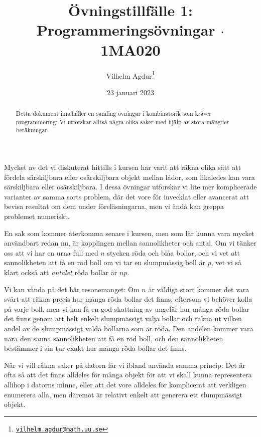 \documentclass[nobib]{tufte-handout}
\title{Övningstillfälle 1: Programmeringsövningar $\cdot$ 1MA020}
\author[Vilhelm Agdur]{Vilhelm Agdur\thanks{\href{mailto:vilhelm.agdur@math.uu.se}{\nolinkurl{vilhelm.agdur@math.uu.se}}}}
\date{23 januari 2023}
\begin{document}
\maketitle%

\begin{abstract}
\noindent
Detta dokument innehåller en samling övningar i kombinatorik som kräver programmering: Vi utforskar alltså några olika saker med hjälp av stora mängder beräkningar.
\end{abstract}

Mycket av det vi diskuterat hittills i kursen har varit att räkna olika sätt att fördela särskiljbara eller osärskiljbara objekt mellan lådor, som likaledes kan vara särskiljbara eller osärskiljbara. I dessa övningar utforskar vi lite mer komplicerade varianter av samma sorts problem, där det vore för invecklat eller avancerat att bevisa resultat om dem under föreläsningarna, men vi ändå kan greppa problemet numeriskt.

En sak som kommer återkomma senare i kursen, men som lär kunna vara mycket användbart redan nu, är kopplingen mellan sannolikheter och antal. Om vi tänker oss att vi har en urna full med $n$ stycken röda och blåa bollar, och vi vet att sannolikheten att få en röd boll om vi tar en slumpmässig boll är $p$, vet vi så klart också att \emph{antalet} röda bollar är $np$.

Vi kan vända på det här resonemanget: Om $n$ är väldigt stort kommer det vara svårt att räkna precis hur många röda bollar det finns, eftersom vi behöver kolla på varje boll, men vi kan få en god skattning av ungefär hur många röda bollar det finns genom att helt enkelt slumpmässigt välja bollar och räkna ut vilken andel av de slumpmässigt valda bollarna som är röda. Den andelen kommer vara nära den sanna sannolikheten att få en röd boll, och den sannolikheten bestämmer i sin tur exakt hur många röda bollar det finns.

När vi vill räkna saker på datorn får vi ibland använda samma princip: Det är ofta så att det finns alldeles för många objekt för att vi skall kunna representera allihop i datorns minne, eller att det vore alldeles för komplicerat att verkligen enumerera alla, men däremot är relativt enkelt att generera ett slumpmässigt objekt.
\end{document}
